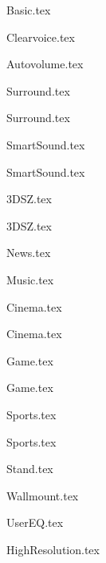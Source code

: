 {Basic.tex}

{Clearvoice.tex}

{Autovolume.tex}

{Surround.tex}

{Surround.tex}

{SmartSound.tex}

{SmartSound.tex}

{3DSZ.tex}

{3DSZ.tex}

{News.tex}

{Music.tex}

{Cinema.tex}

{Cinema.tex}

{Game.tex}

{Game.tex}

{Sports.tex}

{Sports.tex}

{Stand.tex}

{Wallmount.tex}

{UserEQ.tex}

{HighResolution.tex}